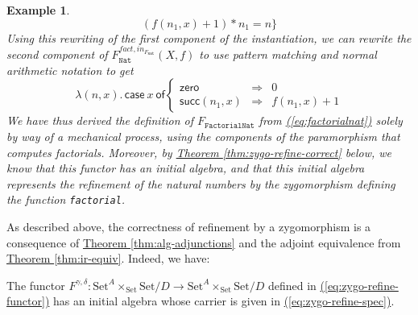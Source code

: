 \documentclass{LMCS}
\newcommand{\tyname}[1]{\texttt{#1}}
\newcommand{\inn}{\mathit{in}}
\newcommand{\Set}{\mathrm{Set}}
\newtheorem{eorollary}{Example}
\newcommand{\parenref}[1]{\hyperref[#1]{(\ref*{#1})}}
\newcommand{\thmref}[1]{\hyperref[#1]{Theorem \ref*{#1}}}
\begin{document}
\begin{eorollary}
\begin{displaymath}
    (f(n_1,x) + 1) * n_1 = n \}
  \end{displaymath}
  Using this rewriting of the first component of the instantiation, we
  can rewrite the second component of
  $F^{\mathit{fact},\inn_{F_{\tyname{Nat}}}}_{\tyname{Nat}}(X,f)$ to
  use pattern matching and normal arithmetic notation to get
  \begin{displaymath}
    \lambda (n,x).\,
    \mathsf{case}\ x\ \mathsf{of}
    \left\{
      \begin{array}{lcl}
        \mathsf{zero} &\Rightarrow& 0 \\
        \mathsf{succ}(n_1,x) &\Rightarrow& f(n_1,x) + 1
      \end{array}
    \right.
  \end{displaymath}
  We have thus derived the definition of $F_{\tyname{FactorialNat}}$
  from \parenref{eq:factorialnat} solely by way of a mechanical
  process, using the components of the paramorphism that computes
  factorials. Moreover, by \thmref{thm:zygo-refine-correct} below, we
  know that this functor has an initial algebra, and that this initial
  algebra represents the refinement of the natural numbers by the
  zygomorphism defining the function \verb|factorial|.
\end{eorollary}

As described above, the correctness of refinement by a zygomorphism is
a consequence of \thmref{thm:alg-adjunctions} and the adjoint
equivalence from \thmref{thm:ir-equiv}. Indeed, we have:

\begin{thm}\label{thm:zygo-refine-correct}
  The functor $F^{\gamma,\delta} : \Set^A \times_\Set \Set/D \to
  \Set^A \times_\Set \Set/D$ defined
  in \parenref{eq:zygo-refine-functor} has an initial algebra whose
  carrier is given in \parenref{eq:zygo-refine-spec}.
\end{thm}
\end{document}
